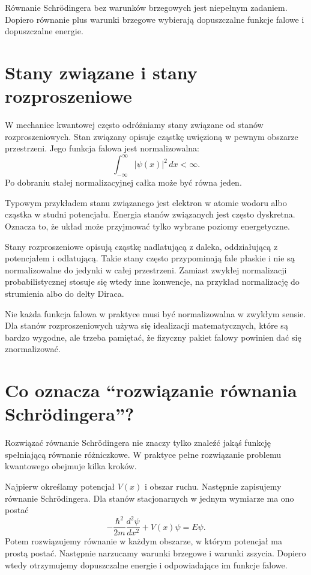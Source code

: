 \begin{summarybox}
Równanie Schrödingera bez warunków brzegowych jest niepełnym zadaniem. Dopiero równanie plus warunki brzegowe wybierają dopuszczalne funkcje falowe i dopuszczalne energie.
\end{summarybox}

\section{Stany związane i stany rozproszeniowe}

W mechanice kwantowej często odróżniamy stany związane od stanów rozproszeniowych. Stan związany opisuje cząstkę uwięzioną w pewnym obszarze przestrzeni. Jego funkcja falowa jest normalizowalna:
\begin{equation}
    \int_{-\infty}^{\infty}|\psi(x)|^2\,dx<\infty.
\end{equation}
Po dobraniu stałej normalizacyjnej całka może być równa jeden.

Typowym przykładem stanu związanego jest elektron w atomie wodoru albo cząstka w studni potencjału. Energia stanów związanych jest często dyskretna. Oznacza to, że układ może przyjmować tylko wybrane poziomy energetyczne.

Stany rozproszeniowe opisują cząstkę nadlatującą z daleka, oddziałującą z potencjałem i odlatującą. Takie stany często przypominają fale płaskie i nie są normalizowalne do jedynki w całej przestrzeni. Zamiast zwykłej normalizacji probabilistycznej stosuje się wtedy inne konwencje, na przykład normalizację do strumienia albo do delty Diraca.

\begin{remarkbox}
Nie każda funkcja falowa w praktyce musi być normalizowalna w zwykłym sensie. Dla stanów rozproszeniowych używa się idealizacji matematycznych, które są bardzo wygodne, ale trzeba pamiętać, że fizyczny pakiet falowy powinien dać się znormalizować.
\end{remarkbox}

\section{Co oznacza ``rozwiązanie równania Schrödingera''?}

Rozwiązać równanie Schrödingera nie znaczy tylko znaleźć jakąś funkcję spełniającą równanie różniczkowe. W praktyce pełne rozwiązanie problemu kwantowego obejmuje kilka kroków.

Najpierw określamy potencjał \(V(x)\) i obszar ruchu. Następnie zapisujemy równanie Schrödingera. Dla stanów stacjonarnych w jednym wymiarze ma ono postać
\begin{equation}
    -\frac{\hbar^2}{2m}\frac{d^2\psi}{dx^2}+V(x)\psi=E\psi.
\end{equation}
Potem rozwiązujemy równanie w każdym obszarze, w którym potencjał ma prostą postać. Następnie narzucamy warunki brzegowe i warunki zszycia. Dopiero wtedy otrzymujemy dopuszczalne energie i odpowiadające im funkcje falowe.

